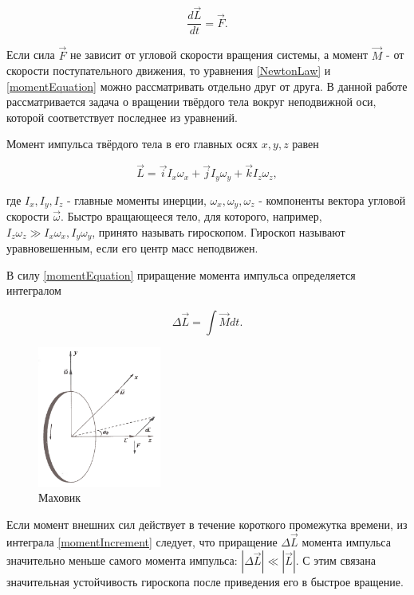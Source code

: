 \documentclass[a4paper,12pt]{article} %
\begin{document}
\begin{equation}
    \frac{d\vec{L}}{dt} = \vec{F}.
    \label{momentEquation}
\end{equation}

Если сила $ \vec{F} $ не зависит от угловой скорости вращения системы, а момент $ \vec{M} $ - от скорости поступательного движения, то уравнения \eqref{NewtonLaw} и \eqref{momentEquation} можно рассматривать отдельно друг от друга. В данной работе рассматривается задача о вращении твёрдого тела вокруг неподвижной оси, которой соответствует последнее из уравнений.

Момент импульса твёрдого тела в его главных осях $ x, y, z $ равен

\begin{equation}
    \vec{L} = \vec{i}I_x\omega_x + \vec{j}I_y\omega_y + \vec{k}I_z\omega_z,
    \label{axisMoments}
\end{equation}

где $ I_x, I_y, I_z $ - главные моменты инерции, $ \omega_x, \omega_y, \omega_z $ - компоненты вектора угловой скорости $ \vec{\omega} $. Быстро вращающееся тело, для которого, например, $ I_z\omega_z \gg I_x\omega_x, I_y\omega_y $, принято называть гироскопом. Гироскоп называют уравновешенным, если его центр масс неподвижен. 

В силу \eqref{momentEquation} приращение момента импульса определяется интегралом

\begin{equation}
    \Delta \vec{L} = \int \vec{M} dt.
    \label{momentIncrement}
\end{equation}

\begin{figure}[h]
    \centering
    \includegraphics[width = 0.36\textwidth]{1.2.5 flywheel.PNG}
    \caption{Маховик}
    \label{fig:flywheel}
\end{figure}

Если момент внешних сил действует в течение короткого промежутка времени, из интеграла \eqref{momentIncrement} следует, что приращение $ \Delta \vec{L} $ момента импульса значительно меньше самого момента импульса: $ |\Delta \vec{L}| \ll |\vec{L}| $. С этим связана значительная устойчивость гироскопа после приведения его в быстрое вращение.
\end{document}
